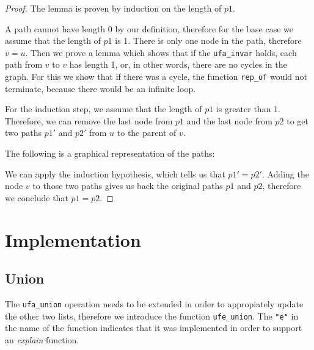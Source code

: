 \begin{proof}
The lemma is proven by induction on the length of $p1$.

A path cannot have length 0 by our definition, therefore for the base case we assume that the length of $p1$ is 1. There is only one node in the path, therefore $v = u$. Then we prove a lemma which shows that if the \lstinline{ufa_invar} holds, each path from $v$ to $v$ has length 1, or, in other words, there are no cycles in the graph. For this we show that if there was a cycle, the function \lstinline{rep_of} would not terminate, because there would be an infinite loop.

For the induction step, we assume that the length of $p1$ is greater than 1. Therefore, we can remove the last node from $p1$ and the last node from $p2$ to get two paths $p1'$ and $p2'$ from $u$ to the parent of $v$.

The following is a graphical representation of the paths:

\begin{center}
\end{center}


We can apply the induction hypothesis, which tells us that $p1' = p2'$. Adding the node $v$ to those two paths gives us back the original paths $p1$ and $p2$, therefore we conclude that $p1 = p2$.
\end{proof}

\section{Implementation}

\subsection{Union}

The \lstinline{ufa_union} operation needs to be extended in order to appropiately update the other two lists, therefore we introduce the function \lstinline{ufe_union}. The \lstinline|"e"| in the name of the function indicates that it was implemented in order to support an \emph{explain} function.

